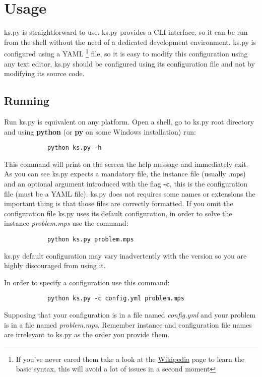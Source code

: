 \section{Usage}

    ks.py is straightforward to use. ks.py provides a CLI interface, so it can be run from the shell 
    without the need of a dedicated development environment. ks.py is configured using a YAML
    \footnote{If you've never eared them take a look at the \href{https://en.wikipedia.org/wiki/YAML}{Wikipedia} page to learn the basic syntax, 
    this will avoid a lot of issues in a second moment } file,
    so it is easy to modify this configuration using any text editor. ks.py should be configured using its configuration file and not by modifying 
    its source code. 

    \subsection{Running}

        Run ks.py is equivalent on any platform. Open a shell, go to ks.py root directory and using \textbf{python} (or \textbf{py} on some Windows installation) run:
        \begin{lstlisting}
            python ks.py -h
        \end{lstlisting}
        This command will print on the screen the help message and immediately exit. As you can see ks.py expects a mandatory file, the instance file (usually .mps) and 
        an optional argument introduced with the flag \textbf{-c}, this is the configuration file (must be a YAML file). ks.py does not requires some names or extensions the important
        thing is that those files are correctly formatted. If you omit the configuration file ks.py uses its default configuration, in order to solve the instance \emph{problem.mps} use 
        the command:
        \begin{lstlisting}
            python ks.py problem.mps
        \end{lstlisting}
        ks.py default configuration may vary inadvertently with the version so you are highly discouraged from using it.

        In order to specify a configuration use this command:
        \begin{lstlisting}
            python ks.py -c config.yml problem.mps
        \end{lstlisting}
        Supposing that your configuration is in a file named \emph{config.yml} and your problem is in a file named \emph{problem.mps}. Remember instance and configuration file names are irrelevant
        to ks.py as the order you provide them.

